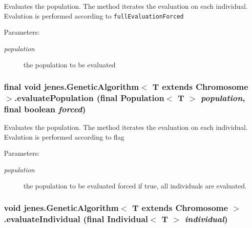 Evaluates the population. The method iterates the evaluation on each individual. Evalution is performed according to {\tt fullEvaluationForced} 

\begin{Desc}
\item[Parameters:]
\begin{description}
\item[{\em population}]the population to be evaluated \end{description}
\end{Desc}
\hypertarget{classjenes_1_1_genetic_algorithm_3_01_t_01extends_01_chromosome_01_4_4a04df077e2b7752248689668889a5a5}{
\subsubsection[evaluatePopulation]{\setlength{\rightskip}{0pt plus 5cm}final void jenes.GeneticAlgorithm$<$ T extends Chromosome $>$.evaluatePopulation (final Population$<$ T $>$ {\em population}, \/  final boolean {\em forced})}}
\label{classjenes_1_1_genetic_algorithm_3_01_t_01extends_01_chromosome_01_4_4a04df077e2b7752248689668889a5a5}


Evaluates the population. The method iterates the evaluation on each individual. Evalution is performed according to flag 

\begin{Desc}
\item[Parameters:]
\begin{description}
\item[{\em population}]the population to be evaluated  forced if true, all individuals are evaluated. \end{description}
\end{Desc}
\hypertarget{classjenes_1_1_genetic_algorithm_3_01_t_01extends_01_chromosome_01_4_17d1c99e638312a18394c6d76dedb2f3}{
\subsubsection[evaluateIndividual]{\setlength{\rightskip}{0pt plus 5cm}void jenes.GeneticAlgorithm$<$ T extends Chromosome $>$.evaluateIndividual (final Individual$<$ T $>$ {\em individual})}}
\label{classjenes_1_1_genetic_algorithm_3_01_t_01extends_01_chromosome_01_4_17d1c99e638312a18394c6d76dedb2f3}


